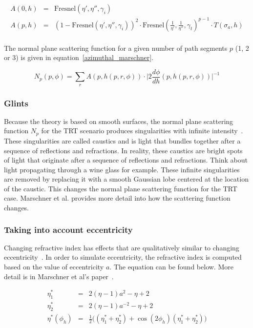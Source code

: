 \documentclass[11pt,a4paper]{report}
\begin{document}
\begin{eqnarray*}
A(0, h) & = & \textrm{Fresnel}( \eta', \eta'', \gamma_i ) \\
A(p, h) & = & (1 - \textrm{Fresnel}( \eta', \eta'', \gamma_i ))^2 \cdot \textrm{Fresnel}( \frac{1}{\eta'}, \frac{1}{\eta''}, \gamma_t )^ {p-1} \cdot T(\sigma_a, h) \\
\label{azimuthal_marschner}
\end{eqnarray*}

The normal plane scattering function for a given number of path segments $p$ (1, 2 or 3) is given in equation~\ref{azimuthal_marschner}.

\begin{equation}
N_p(p, \phi) = \sum\limits_r A(p, h(p, r, \phi)) \cdot \Big \vert 2 \frac{d\phi}{dh}( p, h(p, r, \phi) ) \Big \vert^{-1}
\end{equation}

\subsubsection{Glints}

Because the theory is based on smooth surfaces, the normal plane scattering function $N_p$ for the TRT scenario produces singularities with infinite intensity~\cite{marschner}. These singularities are called caustics and is light that bundles together after a sequence of reflections and refractions. In reality, these caustics are bright spots of light that originate after a sequence of reflections and refractions. Think about light propagating through a wine glass for example. These infinite singularities are removed by replacing it with a smooth Gaussian lobe centered at the location of the caustic. This changes the normal plane scattering function for the TRT case. Marschner et al.\cite{marschner} provides more detail into how the scattering function changes.

\subsubsection{Taking into account eccentricity}

Changing refractive index has effects that are qualitatively similar to changing eccentricity~\cite{marschner}. In order to simulate eccentricity, the refractive index is computed based on the value of eccentricity $a$. The equation can be found below. More detail is in Marschner et al's paper~\cite{marschner}.

\begin{eqnarray}
\eta_1^* & = & 2(\eta - 1) a^2 - \eta + 2 \\
\eta_2^* & = & 2(\eta - 1) a^{-2} - \eta + 2 \\
\eta^*(\phi_h) & = & \frac{1}{2}\big((\eta_1^* + \eta_2^*)+\cos(2\phi_h)(\eta_1^* + \eta_2^*) \big)
\end{eqnarray}
\end{document}
